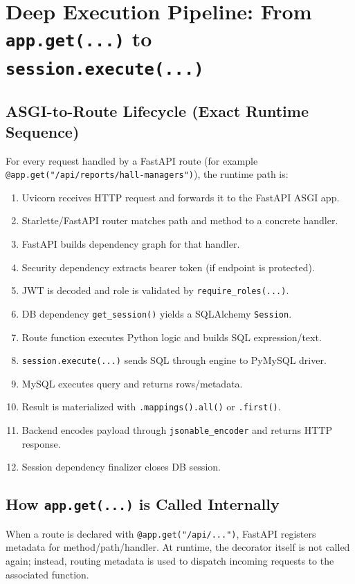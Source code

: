 \documentclass[11pt,a4paper]{article}
\begin{document}
\section{Deep Execution Pipeline: From \texttt{app.get(...)} to \texttt{session.execute(...)}}
\subsection{ASGI-to-Route Lifecycle (Exact Runtime Sequence)}
For every request handled by a FastAPI route (for example \texttt{@app.get("/api/reports/hall-managers")}), the runtime path is:
\begin{enumerate}
  \item Uvicorn receives HTTP request and forwards it to the FastAPI ASGI app.
  \item Starlette/FastAPI router matches path and method to a concrete handler.
  \item FastAPI builds dependency graph for that handler.
  \item Security dependency extracts bearer token (if endpoint is protected).
  \item JWT is decoded and role is validated by \texttt{require\_roles(...)}.
  \item DB dependency \texttt{get\_session()} yields a SQLAlchemy \texttt{Session}.
  \item Route function executes Python logic and builds SQL expression/text.
  \item \texttt{session.execute(...)} sends SQL through engine to PyMySQL driver.
  \item MySQL executes query and returns rows/metadata.
  \item Result is materialized with \texttt{.mappings().all()} or \texttt{.first()}.
  \item Backend encodes payload through \texttt{jsonable\_encoder} and returns HTTP response.
  \item Session dependency finalizer closes DB session.
\end{enumerate}

\subsection{How \texttt{app.get(...)} is Called Internally}
When a route is declared with \texttt{@app.get("/api/...")}, FastAPI registers metadata for method/path/handler. At runtime, the decorator itself is not called again; instead, routing metadata is used to dispatch incoming requests to the associated function.
\end{document}
